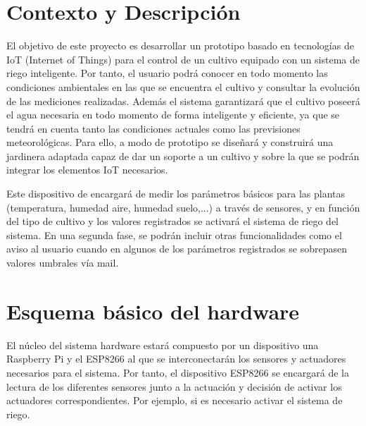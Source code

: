 \documentclass[12pt,a4paper,titlepage,oneside]{report}
\title{\titulo}
\author{\autor}
\begin{document}



\tableofcontents
\listoffigures

\chapter{Contexto y Descripción}
	El objetivo de este proyecto es desarrollar un prototipo basado en tecnologías de IoT (Internet of Things) para el control de un cultivo equipado con un sistema de riego inteligente. Por tanto, el usuario podrá conocer en todo momento las condiciones ambientales en las que se encuentra el cultivo y consultar la evolución de las mediciones realizadas. Además el sistema garantizará que el cultivo poseerá el agua necesaria en todo momento de forma inteligente y eficiente, ya que se tendrá en cuenta tanto las condiciones actuales como las previsiones meteorológicas. Para ello, a modo de prototipo se diseñará y construirá una jardinera adaptada capaz de dar un soporte a un cultivo y sobre la que se podrán integrar los elementos IoT necesarios.


	Este dispositivo de encargará de medir los parámetros básicos para las plantas (temperatura, humedad aire, humedad suelo,...) a través de sensores, y en función del tipo de cultivo y los valores registrados se activará el sistema de riego del sistema. En una segunda fase, se podrán incluir otras funcionalidades como el aviso al usuario cuando en algunos de los parámetros registrados se sobrepasen valores umbrales vía mail.




\chapter{Esquema básico del hardware}

	El núcleo del sistema hardware estará compuesto por un dispositivo una Raspberry Pi y el ESP8266 al que se interconectarán los sensores y actuadores necesarios para el sistema. Por tanto, el dispositivo ESP8266 se encargará de la lectura de los diferentes sensores junto a la actuación y decisión de activar los actuadores correspondientes. Por ejemplo, si es necesario activar el sistema de riego.
\end{document}

